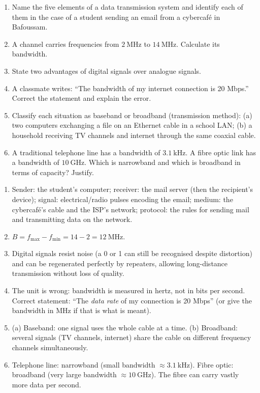 \documentclass[11pt]{article}
\begin{document}
\begin{exercice}
\begin{enumerate}
\item Name the five elements of a data transmission system and identify each of them in the case of a student sending an email from a cybercafé in Bafoussam.
\item A channel carries frequencies from $2\ \mathrm{MHz}$ to $14\ \mathrm{MHz}$. Calculate its bandwidth.
\item State two advantages of digital signals over analogue signals.
\item A classmate writes: ``The bandwidth of my internet connection is 20 Mbps.'' Correct the statement and explain the error.
\item Classify each situation as baseband or broadband (transmission method): (a) two computers exchanging a file on an Ethernet cable in a school LAN; (b) a household receiving TV channels and internet through the same coaxial cable.
\item A traditional telephone line has a bandwidth of $3.1\ \mathrm{kHz}$. A fibre optic link has a bandwidth of $10\ \mathrm{GHz}$. Which is narrowband and which is broadband in terms of capacity? Justify.
\end{enumerate}
\end{exercice}

\begin{corrige}[Exercise 1]
\begin{enumerate}
\item Sender: the student's computer; receiver: the mail server (then the recipient's device); signal: electrical/radio pulses encoding the email; medium: the cybercafé's cable and the ISP's network; protocol: the rules for sending mail and transmitting data on the network.
\item $B = f_{\max} - f_{\min} = 14 - 2 = 12\ \mathrm{MHz}$.
\item Digital signals resist noise (a 0 or 1 can still be recognised despite distortion) and can be regenerated perfectly by repeaters, allowing long-distance transmission without loss of quality.
\item The unit is wrong: bandwidth is measured in hertz, not in bits per second. Correct statement: ``The \emph{data rate} of my connection is 20 Mbps'' (or give the bandwidth in MHz if that is what is meant).
\item (a) Baseband: one signal uses the whole cable at a time. (b) Broadband: several signals (TV channels, internet) share the cable on different frequency channels simultaneously.
\item Telephone line: narrowband (small bandwidth $\approx 3.1\ \mathrm{kHz}$). Fibre optic: broadband (very large bandwidth $\approx 10\ \mathrm{GHz}$). The fibre can carry vastly more data per second.
\end{enumerate}
\end{corrige}
\end{document}

